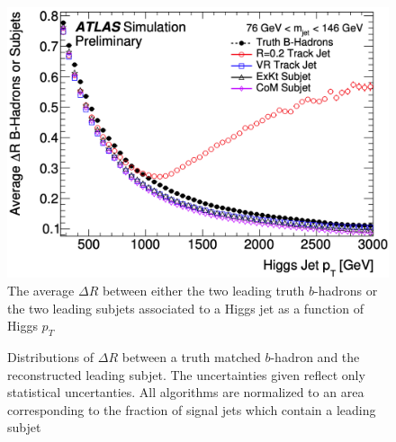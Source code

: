 \begin{figure}[!htbp]
  \centering
  \includegraphics[width=0.98\linewidth]{figures/objects/average_deltaR}

  \caption{\cite{ATL-PHYS-PUB-2017-010} The average $\Delta R$ between either
the two leading truth $b$-hadrons or the two leading subjets associated to a
Higgs jet as a function of Higgs $p_{T}$}
  \label{sec:objects:average_deltaR}
\end{figure}

\begin{figure}[!htbp]
  \centering
   \hfill

  \caption{\cite{ATL-PHYS-PUB-2017-010} Distributions of $\Delta R$ between a
truth matched $b$-hadron and the reconstructed leading subjet.  The
uncertainties given reflect only statistical uncertanties.  All algorithms are
normalized to an area corresponding to the fraction of signal jets which
contain a leading subjet} 
  \label{sec:objects:leading_vr}
\end{figure}

